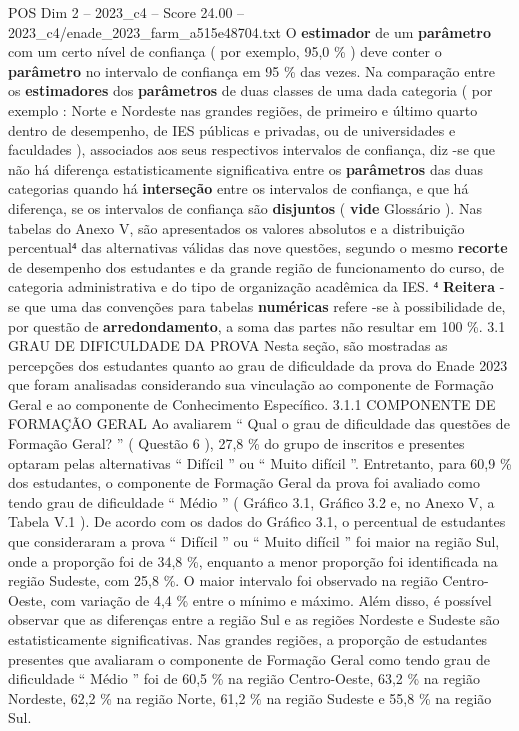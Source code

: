 \begin{textsample}{POS Dim 2 – 2023\_c4 – Score 24.00 – 2023\_c4/enade\_2023\_farm\_a515e48704.txt}
O \textbf{estimador} de um \textbf{parâmetro} com um certo nível de confiança ( por exemplo, 95,0 \% ) deve conter o \textbf{parâmetro} no intervalo de confiança em 95 \% das vezes.
Na comparação entre os \textbf{estimadores} dos \textbf{parâmetros} de duas classes de uma dada categoria ( por exemplo : Norte e Nordeste nas grandes regiões, de primeiro e último quarto dentro de desempenho, de IES públicas e privadas, ou de universidades e faculdades ), associados aos seus respectivos intervalos de confiança, diz -se que não há diferença estatisticamente significativa entre os \textbf{parâmetros} das duas categorias quando há \textbf{interseção} entre os intervalos de confiança, e que há diferença, se os intervalos de confiança são \textbf{disjuntos} ( \textbf{vide} Glossário ).
Nas tabelas do Anexo V, são apresentados os valores absolutos e a distribuição percentual⁴ das alternativas válidas das nove questões, segundo o mesmo \textbf{recorte} de desempenho dos estudantes e da grande região de funcionamento do curso, de categoria administrativa e do tipo de organização acadêmica da IES. ⁴ \textbf{Reitera} -se que uma das convenções para tabelas \textbf{numéricas} refere -se à possibilidade de, por questão de \textbf{arredondamento}, a soma das partes não resultar em 100 \%. 3.1 GRAU DE DIFICULDADE DA PROVA Nesta seção, são mostradas as percepções dos estudantes quanto ao grau de dificuldade da prova do Enade 2023 que foram analisadas considerando sua vinculação ao componente de Formação Geral e ao componente de Conhecimento Específico. 3.1.1 COMPONENTE DE FORMAÇÃO GERAL Ao avaliarem “ Qual o grau de dificuldade das questões de Formação Geral? ” ( Questão 6 ), 27,8 \% do grupo de inscritos e presentes optaram pelas alternativas “ Difícil ” ou “ Muito difícil ”.
Entretanto, para 60,9 \% dos estudantes, o componente de Formação Geral da prova foi avaliado como tendo grau de dificuldade “ Médio ” ( Gráfico 3.1, Gráfico 3.2 e, no Anexo V, a Tabela V.1 ).
De acordo com os dados do Gráfico 3.1, o percentual de estudantes que consideraram a prova “ Difícil ” ou “ Muito difícil ” foi maior na região Sul, onde a proporção foi de 34,8 \%, enquanto a menor proporção foi identificada na região Sudeste, com 25,8 \%.
O maior intervalo foi observado na região Centro-Oeste, com variação de 4,4 \% entre o mínimo e máximo.
Além disso, é possível observar que as diferenças entre a região Sul e as regiões Nordeste e Sudeste são estatisticamente significativas.
Nas grandes regiões, a proporção de estudantes presentes que avaliaram o componente de Formação Geral como tendo grau de dificuldade “ Médio ” foi de 60,5 \% na região Centro-Oeste, 63,2 \% na região Nordeste, 62,2 \% na região Norte, 61,2 \% na região Sudeste e 55,8 \% na região Sul.

\end{textsample}
